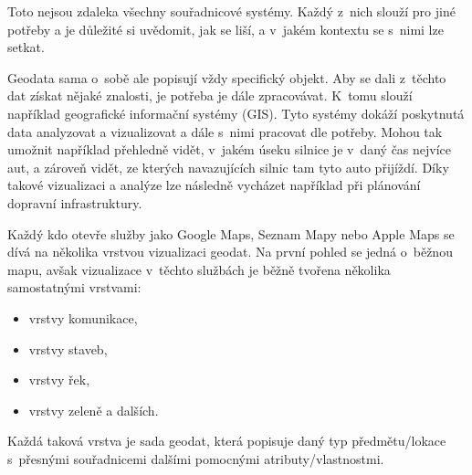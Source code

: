 Toto nejsou zdaleka všechny souřadnicové systémy. Každý z~nich slouží pro jiné potřeby a je důležité si uvědomit, jak se liší, a v~jakém kontextu se s~nimi lze setkat.



Geodata sama o~sobě ale popisují vždy specifický objekt. Aby se dali z~těchto dat získat nějaké znalosti, je potřeba je dále zpracovávat. K~tomu slouží například geografické informační systémy (GIS). Tyto systémy dokáží poskytnutá data analyzovat a vizualizovat a dále s~nimi pracovat dle potřeby. Mohou tak umožnit například přehledně vidět, v~jakém úseku silnice je v~daný čas nejvíce aut, a zároveň vidět, ze kterých navazujících silnic tam tyto auto přijíždí. Díky takové vizualizaci a analýze lze následně vycházet například při plánování dopravní infrastruktury.

Každý kdo otevře služby jako Google Maps, Seznam Mapy nebo Apple Maps se dívá na několika vrstvou vizualizaci geodat. Na první pohled se jedná o~běžnou mapu, avšak vizualizace v~těchto službách je běžně tvořena několika samostatnými vrstvami:

\begin{itemize}
    \item vrstvy komunikace,
    \item vrstvy staveb,
    \item vrstvy řek,
    \item vrstvy zeleně a dalších.
\end{itemize}

Každá taková vrstva je sada geodat, která popisuje daný typ předmětu/lokace s~přesnými souřadnicemi dalšími pomocnými atributy/vlastnostmi.

